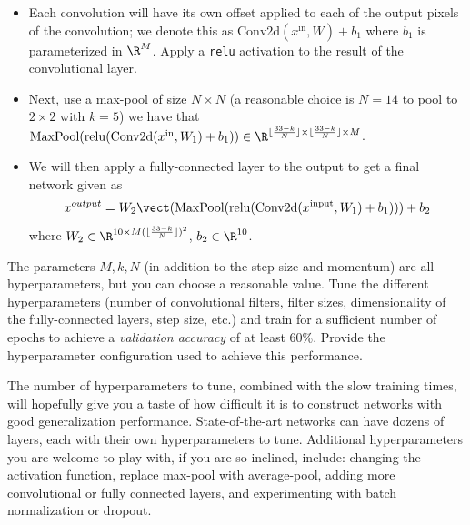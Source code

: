 \documentclass{article}
\begin{document}
\begin{aprob}
\begin{enumerate}
  \begin{itemize}
      \item Each convolution will have its own offset applied to each of the output pixels of the convolution; we denote this as $\mathrm{Conv2d}(x^\text{in}, W) + b_1$ where $b_1$ is parameterized in $\R^M$. Apply a \texttt{relu} activation to the result of the convolutional layer. 
      \item Next, use a max-pool of size $N \times N$ (a reasonable choice is $N=14$ to pool to $2 \times 2$ with $k=5$) we have that $\textrm{MaxPool}( \mathrm{relu}( \mathrm{Conv2d}(x^\text{in}, W_1)+b_1)) \in \R^{\lfloor\frac{33-k}{N}\rfloor \times \lfloor\frac{33-k}{N}\rfloor \times M}$.
      \item We will then apply a fully-connected layer to the output to get a final network given as
          \begin{align*}
          x^{output} = W_2 \vect(\textrm{MaxPool}( \mathrm{relu}( \mathrm{Conv2d}(x^\text{input}, W_1)+b_1))) + b_2
          \end{align*}
    where $W_2 \in \R^{10 \times M (\lfloor\frac{33-k}{N}\rfloor)^2}$, $b_2 \in \R^{10}$.
  \end{itemize}
  
  The parameters $M,k,N$ (in addition to the step size and momentum) are all hyperparameters, but you can choose a reasonable value. Tune the different hyperparameters (number of convolutional filters, filter sizes, dimensionality of the fully-connected layers, step size, etc.) and train for a sufficient number of epochs to achieve a \emph{validation accuracy} of at least 60\%. Provide the hyperparameter configuration used to achieve this performance.
  
The number of hyperparameters to tune, combined with the slow training times, will hopefully give you a taste of how difficult it is to construct networks with good generalization performance. State-of-the-art networks can have dozens of layers, each with their own hyperparameters to tune. Additional hyperparameters you are welcome to play with, if you are so inclined, include: changing the activation function, replace max-pool with average-pool, adding more convolutional or fully connected layers, and experimenting with batch normalization or dropout.
\end{enumerate}

\end{aprob}
\end{document}

